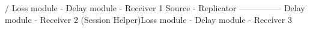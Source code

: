 \documentclass{article}
\begin{document}
\begin{program}
                    / Loss module - Delay module - Receiver 1
Source - Replicator --------------- Delay module - Receiver 2
    (Session Helper)\bs Loss module - Delay module - Receiver 3

\end{program}
\end{document}

